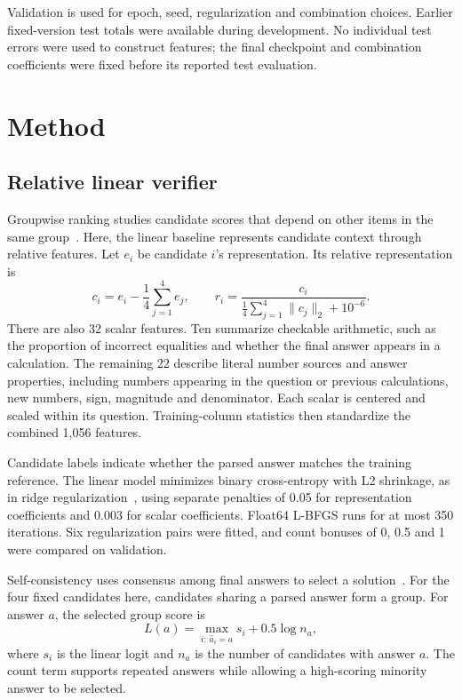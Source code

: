\documentclass[11pt,a4paper]{article}
\begin{document}
Validation is used for epoch, seed, regularization and combination choices. Earlier fixed-version test totals were available during development. No individual test errors were used to construct features; the final checkpoint and combination coefficients were fixed before its reported test evaluation.

\clearpage
\section{Method}

\subsection{Relative linear verifier}

Groupwise ranking studies candidate scores that depend on other items in the same group~\cite{groupwise}. Here, the linear baseline represents candidate context through relative features. Let $e_i$ be candidate $i$'s representation. Its relative representation is
\[
 c_i=e_i-\frac14\sum_{j=1}^4e_j,
 \qquad
 r_i=\frac{c_i}{\frac14\sum_{j=1}^4\lVert c_j\rVert_2+10^{-6}}.
\]
There are also 32 scalar features. Ten summarize checkable arithmetic, such as the proportion of incorrect equalities and whether the final answer appears in a calculation. The remaining 22 describe literal number sources and answer properties, including numbers appearing in the question or previous calculations, new numbers, sign, magnitude and denominator. Each scalar is centered and scaled within its question. Training-column statistics then standardize the combined 1,056 features.

Candidate labels indicate whether the parsed answer matches the training reference. The linear model minimizes binary cross-entropy with L2 shrinkage, as in ridge regularization~\cite{ridge}, using separate penalties of 0.05 for representation coefficients and 0.003 for scalar coefficients. Float64 L-BFGS runs for at most 350 iterations. Six regularization pairs were fitted, and count bonuses of 0, 0.5 and 1 were compared on validation.

Self-consistency uses consensus among final answers to select a solution~\cite{selfconsistency}. For the four fixed candidates here, candidates sharing a parsed answer form a group. For answer $a$, the selected group score is
\[
 L(a)=\max_{i:\,\hat a_i=a}s_i+0.5\log n_a,
\]
where $s_i$ is the linear logit and $n_a$ is the number of candidates with answer $a$. The count term supports repeated answers while allowing a high-scoring minority answer to be selected.
\end{document}
